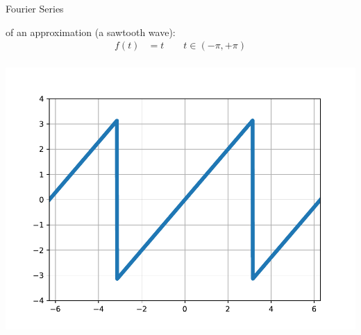 \begin{frame}[t]{Fourier Series}

    \myExample of an approximation (a sawtooth wave):
    {\scriptsize
    \begin{align*}
        f(t) & = t \quad\quad t \in \left(-\pi,+\pi\right) \\
    \end{align*}}%

    \vspace{-0.5cm}
    \begin{center}
        \includegraphics[height=0.7\textheight, trim={0  0.5cm 0 1cm},clip]{zigzag_signal.pdf}
    \end{center}
\end{frame}


